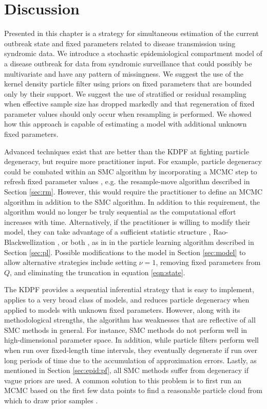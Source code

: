 \section{Discussion \label{sec:discussion}}

Presented in this chapter is a strategy for simultaneous estimation of the current outbreak state and fixed parameters related to disease transmission using syndromic data. We introduce a stochastic epidemiological compartment model of a disease outbreak for data from syndromic surveillance that could possibly be multivariate and have any pattern of missingness. We suggest the use of the kernel density particle filter \citep{Liu:West:comb:2001} using priors on fixed parameters that are bounded only by their support. We suggest the use of stratified or residual resampling when effective sample size has dropped markedly and that regeneration of fixed parameter values should only occur when resampling is performed. We showed how this approach is capable of estimating a model with additional unknown fixed parameters.

Advanced techniques exist that are better than the KDPF at fighting particle degeneracy, but require more practitioner input. For example, particle degeneracy could be combated within an SMC algorithm by incorporating a MCMC step to refresh fixed parameter values \citep{Gilk:Berz:foll:2001,Stor:part:2002}, e.g. the resample-move algorithm described in Section \ref{sec:rm}. However, this would require the practitioner to define an MCMC algorithm in addition to the SMC algorithm. In addition to this requirement, the algorithm would no longer be truly sequential as the computational effort increases with time. Alternatively, if the practitioner is willing to modify their model, they can take advantage of a sufficient statistic structure \citep{Fear:mark:2002}, Rao-Blackwellization \citep{Douc:Gods:Andr:on:2000}, or both \citep{Carv:Joha:Lope:Pols:part}, as in in the particle learning algorithm described in Section \ref{sec:pl}. Possible modifications to the model in Section \ref{sec:model} to allow alternative strategies include setting $\nu=1$, removing fixed parameters from $Q$, and eliminating the truncation in equation \eqref{eqn:state}.

The KDPF provides a sequential inferential strategy that is easy to implement, applies to a very broad class of models, and reduces particle degeneracy when applied to models with unknown fixed parameters. However, along with its methodological strengths, the algorithm has weaknesses that are reflective of all SMC methods in general. For instance, SMC methods do not perform well in high-dimensional parameter space. In addition, while particle filters perform well when run over fixed-length time intervals, they eventually degenerate if run over long periods of time due to the accumulation of approximation errors. Lastly, as mentioned in Section \ref{sec:epid:pf}, all SMC methods suffer from degeneracy if vague priors are used. A common solution to this problem is to first run an MCMC based on the first few data points to find a reasonable particle cloud from which to draw prior samples \cite[Chap 5,][]{petris:camp:2009:dynamic}.

